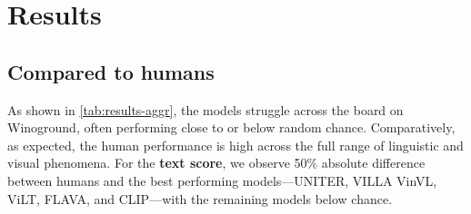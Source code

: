 \documentclass[10pt,twocolumn,letterpaper]{article}
\begin{document}
\section{Results}\label{sec:results}

\subsection{Compared to humans}
As shown in \cref{tab:results-aggr}, the models struggle across the board on Winoground, often performing close to or below random chance. Comparatively, as expected, the human performance is high across the full range of linguistic and visual phenomena.
For the \textbf{text score}, we observe 50\% absolute difference between humans and the best performing models---UNITER, VILLA VinVL, ViLT, FLAVA, and CLIP---with the remaining models below chance.
\end{document}
